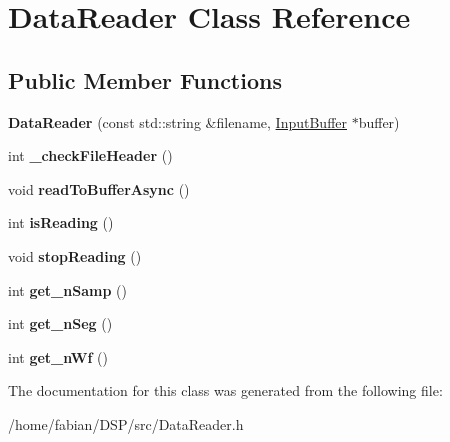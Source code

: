 \hypertarget{classDataReader}{\section{Data\-Reader Class Reference}
\label{classDataReader}
}
\subsection*{Public Member Functions}
\begin{DoxyCompactItemize}
\item 
\hypertarget{classDataReader_adba9892886eceb717d50ffc02bf8e2c2}{{\bfseries Data\-Reader} (const std\-::string \&filename, \hyperlink{classRingbuffer}{Input\-Buffer} $\ast$buffer)}\label{classDataReader_adba9892886eceb717d50ffc02bf8e2c2}

\item 
\hypertarget{classDataReader_aa53ed71dd3a6220e8f6d7d3f3db31ade}{int {\bfseries \-\_\-check\-File\-Header} ()}\label{classDataReader_aa53ed71dd3a6220e8f6d7d3f3db31ade}

\item 
\hypertarget{classDataReader_ae657eb3b65c75418f21ba9f03ac12b13}{void {\bfseries read\-To\-Buffer\-Async} ()}\label{classDataReader_ae657eb3b65c75418f21ba9f03ac12b13}

\item 
\hypertarget{classDataReader_a8a5bf454b34839d63e5d0c6ca7573682}{int {\bfseries is\-Reading} ()}\label{classDataReader_a8a5bf454b34839d63e5d0c6ca7573682}

\item 
\hypertarget{classDataReader_a4d153d457d8121a14386050a5a5618ce}{void {\bfseries stop\-Reading} ()}\label{classDataReader_a4d153d457d8121a14386050a5a5618ce}

\item 
\hypertarget{classDataReader_a8ada95ad5aca5fbb3e50f0b6a954a623}{int {\bfseries get\-\_\-n\-Samp} ()}\label{classDataReader_a8ada95ad5aca5fbb3e50f0b6a954a623}

\item 
\hypertarget{classDataReader_a94f681f6c77c9ad57c09b26fc367084b}{int {\bfseries get\-\_\-n\-Seg} ()}\label{classDataReader_a94f681f6c77c9ad57c09b26fc367084b}

\item 
\hypertarget{classDataReader_ad754d5ff3d2e833aaabf9460f47a77e4}{int {\bfseries get\-\_\-n\-Wf} ()}\label{classDataReader_ad754d5ff3d2e833aaabf9460f47a77e4}

\end{DoxyCompactItemize}


The documentation for this class was generated from the following file\-:\begin{DoxyCompactItemize}
\item 
/home/fabian/\-D\-S\-P/src/Data\-Reader.\-h\end{DoxyCompactItemize}

